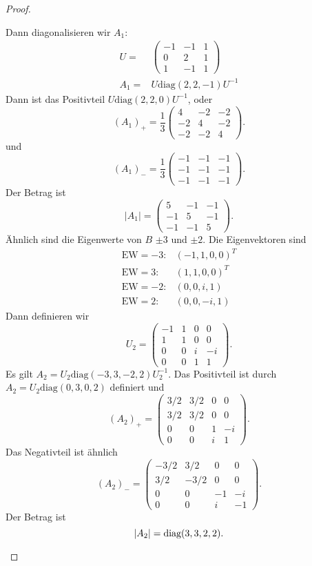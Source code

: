 \begin{proof}
\begin{parts}
		Dann diagonalisieren wir $A_1$:
		\begin{align*}
			U=&\begin{pmatrix} -1 & -1 & 1 \\ 0 & 2 & 1 \\ 1 & -1 & 1 \end{pmatrix}\\
			A_1=&U\text{diag}(2,2,-1)U^{-1}
		\end{align*}
		Dann ist das Positivteil $U\text{diag}(2,2,0)U^{-1}$, oder
		 \[
			 (A_1)_+=\frac{1}{3}\begin{pmatrix} 4 & -2 & -2 \\ -2 & 4 & -2 \\ -2 & -2 & 4 \end{pmatrix} 
		.\] 
		und
		\[
			(A_1)_{-}=\frac{1}{3}\begin{pmatrix} -1 & -1 & -1 \\ -1 & -1 & -1 \\ -1 & -1 & -1 \end{pmatrix} 
		.\] 
	Der Betrag ist
	\[
		|A_1|=\begin{pmatrix} 5 & -1 & -1 \\ -1 & 5 & -1 \\ -1 & -1 & 5 \end{pmatrix} 
	.\] 
		Ähnlich sind die Eigenwerte von $B$ $\pm 3$ und $\pm 2$. Die Eigenvektoren sind
		\begin{align*}
			\text{EW}=-3:& (-1,1,0,0)^T\\
			\text{EW}=3:&(1,1,0,0)^T\\
			\text{EW}=-2:&(0,0,i,1)\\
			\text{EW}=2:& (0,0,-i,1)
		\end{align*}
		Dann definieren wir
		 \[
			 U_2=\begin{pmatrix} -1 & 1 & 0 & 0 \\ 1 & 1 & 0 & 0 \\ 0 & 0 & i & -i \\ 0 & 0 & 1 & 1 \end{pmatrix} 
		.\] 
		Es gilt $A_2=U_2\text{diag}(-3,3,-2,2)U_2^{-1}$. Das Positivteil ist durch $A_2=U_2\text{diag}(0,3,0,2)$ definiert und
		\[
			(A_2)_+=\begin{pmatrix} 3 / 2 & 3 / 2 & 0 & 0 \\ 3 / 2 & 3 / 2 & 0 & 0 \\ 0 & 0 & 1 & -i \\ 0 & 0 & i & 1 \end{pmatrix} 
		.\] 
		Das Negativteil ist ähnlich
		\[
			(A_2)_{-}=\begin{pmatrix} - 3 / 2 & 3 / 2 & 0 & 0 \\ 3 / 2 & - 3 / 2 & 0 & 0 \\ 0 & 0 & -1 & -i \\ 0 & 0 & i & -1 \end{pmatrix} 
		.\] 
		Der Betrag ist
		\[
			|A_2|=\text{diag}(3,3,2,2)
		.\qedhere\] 
	\end{parts}
\end{proof}
